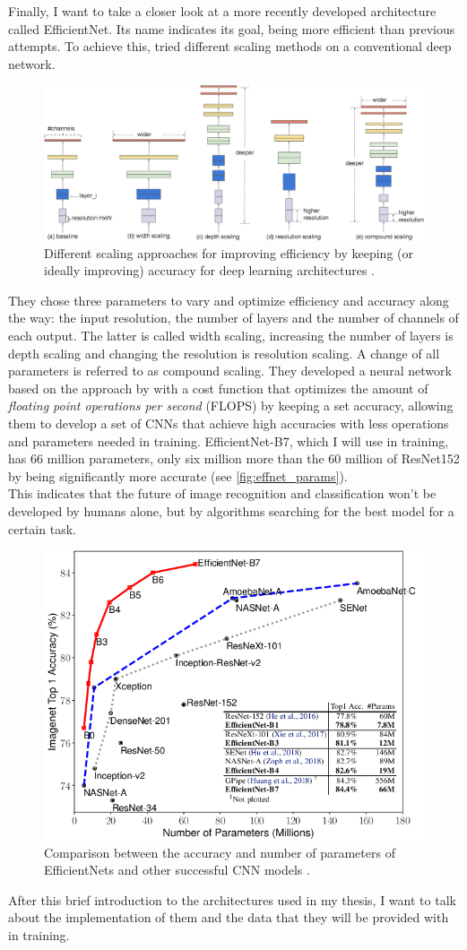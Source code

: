 Finally, I want to take a closer look at a more recently developed architecture called EfficientNet. Its name indicates its goal, being more efficient than previous attempts. To achieve this, \citet{tan2020efficientnet} tried different scaling methods on a conventional deep network. 

\begin{figure}[h]
\centering
\includegraphics[width=\textwidth]{images/Chapter2/2-Figure2-1 (1).png}
\caption{Different scaling approaches for improving efficiency by keeping (or ideally improving) accuracy for deep learning architectures \citep{tan2020efficientnet}. } 
\label{fig:effnet_scaling}
\end{figure}

They chose three parameters to vary and optimize efficiency and accuracy along the way: the input resolution, the number of layers and the number of channels of each output. The latter is called width scaling, increasing the number of layers is depth scaling and changing the resolution is resolution scaling. A change of all parameters is referred to as compound scaling. They developed a neural network based on the approach by \citet{tan2019mnasnet} with a cost function that optimizes the amount of \textit{floating point operations per second} (FLOPS) by keeping a set accuracy, allowing them to develop a set of CNNs that achieve high accuracies with less operations and parameters needed in training. EfficientNet-B7, which I will use in training, has 66 million parameters, only six million more than the 60 million of ResNet152 by being significantly more accurate (see \autoref{fig:effnet_params}). \\
This indicates that the future of image recognition and classification won't be developed by humans alone, but by algorithms searching for the best model for a certain task.

\begin{figure}[H]
\centering
\includegraphics[width=.5\textwidth]{images/Chapter2/1-Figure1-1.png}
\caption{Comparison between the accuracy and number of parameters of EfficientNets and other successful CNN models \citep{tan2020efficientnet}. } 
\label{fig:effnet_params}
\end{figure}

After this brief introduction to the architectures used in my thesis, I want to talk about the implementation of them and the data that they will be provided with in training. 
